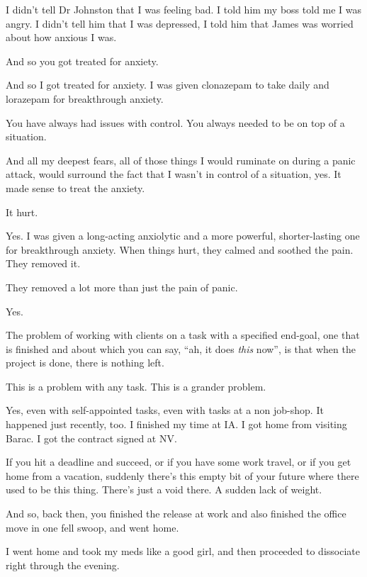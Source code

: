 \begin{paracol}{2}
\begin{leftcolumn}
I didn't tell Dr Johnston that I was feeling bad. I told him my boss told me I was angry. I didn't tell him that I was depressed, I told him that James was worried about how anxious I was.

\begin{ally}
And so you got treated for anxiety.
\end{ally}
And so I got treated for anxiety. I was given clonazepam to take daily and lorazepam for breakthrough anxiety.

\begin{ally}
You have always had issues with control. You always needed to be on top of a situation.
\end{ally}
And all my deepest fears, all of those things I would ruminate on during a panic attack, would surround the fact that I wasn't in control of a situation, yes. It made sense to treat the anxiety.

\begin{ally}
It hurt.
\end{ally}
Yes. I was given a long-acting anxiolytic and a more powerful, shorter-lasting one for breakthrough anxiety. When things hurt, they calmed and soothed the pain. They removed it.

\begin{ally}
They removed a lot more than just the pain of panic.
\end{ally}
Yes.
\newpage

\noindent The problem of working with clients on a task with a specified end-goal, one that is finished and about which you can say, ``ah, it does \emph{this} now'', is that when the project is done, there is nothing left.

\begin{ally}
This is a problem with any task. This is a grander problem.
\end{ally}
Yes, even with self-appointed tasks, even with tasks at a non job-shop. It happened just recently, too. I finished my time at IA. I got home from visiting Barac. I got the contract signed at NV.

If you hit a deadline and succeed, or if you have some work travel, or if you get home from a vacation, suddenly there's this empty bit of your future where there used to be this thing. There's just a void there. A sudden lack of weight.

\begin{ally}
And so, back then, you finished the release at work and also finished the office move in one fell swoop, and went home.
\end{ally}
I went home and took my meds like a good girl, and then proceeded to dissociate right through the evening.


\end{leftcolumn}
\end{paracol}
